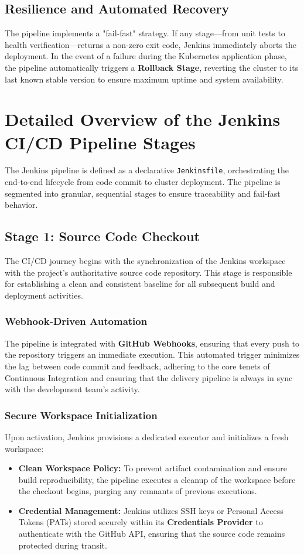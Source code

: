 \documentclass[12pt,a4paper]{report}
\begin{document}
\section{Resilience and Automated Recovery}
The pipeline implements a "fail-fast" strategy. If any stage---from unit tests to health verification---returns a non-zero exit code, Jenkins immediately aborts the deployment. In the event of a failure during the Kubernetes application phase, the pipeline automatically triggers a \textbf{Rollback Stage}, reverting the cluster to its last known stable version to ensure maximum uptime and system availability.

\chapter{Detailed Overview of the Jenkins CI/CD Pipeline Stages}
The Jenkins pipeline is defined as a declarative \texttt{Jenkinsfile}, orchestrating the end-to-end lifecycle from code commit to cluster deployment. The pipeline is segmented into granular, sequential stages to ensure traceability and fail-fast behavior.

\section{Stage 1: Source Code Checkout}
The CI/CD journey begins with the synchronization of the Jenkins workspace with the project's authoritative source code repository. This stage is responsible for establishing a clean and consistent baseline for all subsequent build and deployment activities.

\subsection{Webhook-Driven Automation}
The pipeline is integrated with \textbf{GitHub Webhooks}, ensuring that every push to the repository triggers an immediate execution. This automated trigger minimizes the lag between code commit and feedback, adhering to the core tenets of Continuous Integration and ensuring that the delivery pipeline is always in sync with the development team's activity.

\subsection{Secure Workspace Initialization}
Upon activation, Jenkins provisions a dedicated executor and initializes a fresh workspace:
\begin{itemize}
    \item \textbf{Clean Workspace Policy:} To prevent artifact contamination and ensure build reproducibility, the pipeline executes a cleanup of the workspace before the checkout begins, purging any remnants of previous executions.
    \item \textbf{Credential Management:} Jenkins utilizes SSH keys or Personal Access Tokens (PATs) stored securely within its \textbf{Credentials Provider} to authenticate with the GitHub API, ensuring that the source code remains protected during transit.
\end{itemize}
\end{document}
